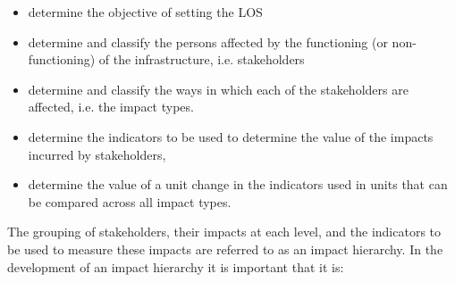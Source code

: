 \begin{itemize}%
\item determine the objective of setting the LOS
\item determine and classify the persons affected by the functioning (or non-functioning) of the infrastructure, i.e. stakeholders
\item determine and classify the ways in which each of the stakeholders are affected, i.e. the impact types. 
\item determine the indicators to be used to determine the value of the impacts incurred by stakeholders,
\item determine the value of a unit change in the indicators used in units that can be compared across all impact types.                                                                                                                    \end{itemize}


The grouping of stakeholders, their impacts at each level, and the indicators to be used to measure these impacts are referred to as an impact hierarchy. In the development of an impact hierarchy it is important that it is: 

